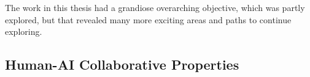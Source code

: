 
The work in this thesis had a grandiose overarching objective, which was partly explored, but that revealed many more exciting areas and paths to continue exploring.




\subsection{Human-AI Collaborative Properties}

